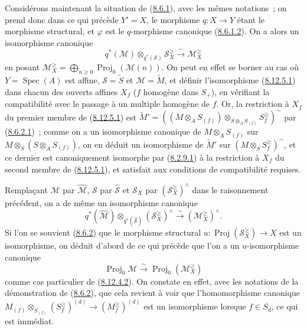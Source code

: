 \begin{env}[8.12.5]
\label{II.8.12.5-fr}
Considérons maintenant la situation de (\hyperref[II.8.6.1-fr]{8.6.1}),
avec les mêmes notations~; on prend donc dans ce qui précède $Y'=X$, le
morphisme $q:X\to Y$ étant le morphisme structural, et $\varphi$ est le
$q$-morphisme canonique (\hyperref[II.8.6.1.2-fr]{8.6.1.2}). On a alors un
isomorphisme canonique
\begin{equation}
\label{II.8.12.5.1-fr}
  q^*(\mathcal{M})\otimes_{q^*(\mathcal{S})}\mathcal{S}_X^{\geq}
  \xrightarrow{\sim}\mathcal{M}_X^{\geq}
\tag{8.12.5.1}
\end{equation}
en posant
$\mathcal{M}_X^{\geq}=\bigoplus_{n\geq0}\operatorname{Proj}_0(\mathcal{M}(n))$.
On peut en effet se borner au cas où $Y=\operatorname{Spec}(A)$ est affine,
$\mathcal{S}=\widetilde{S}$ et $\mathcal{M}=\widetilde{M}$, et définir
l'isomorphisme (\hyperref[II.8.12.5.1-fr]{8.12.5.1}) dans chacun des ouverts
affines $X_f$ ($f$ homogène dans $S_+$), en vérifiant la compatibilité avec le
passage à un multiple homogène de $f$. Or, la restriction à $X_f$ du premier
membre de (\hyperref[II.8.12.5.1-fr]{8.12.5.1}) est
$\widetilde{M}'=
\left((M\otimes_A S_{(f)})
\otimes_{S\otimes_A S_{(f)}}S_f^{\geq}\right)^{\sim}$ par
(\hyperref[II.8.6.2.1-fr]{8.6.2.1})~; comme on a un isomorphisme canonique de
$M\otimes_A S_{(f)}$ sur $M\otimes_S(S\otimes_A S_{(f)})$, on en déduit un
isomorphisme de $\widetilde{M}'$ sur
$\left(M\otimes_S S_f^{\geq}\right)^{\sim}$, et ce dernier est
canoniquement isomorphe par (\hyperref[II.8.2.9.1-fr]{8.2.9.1}) à la
restriction à $X_f$ du second membre de
(\hyperref[II.8.12.5.1-fr]{8.12.5.1}), et satisfait aux conditions de
compatibilité requises.

Remplaçant $\mathcal{M}$ par $\widehat{\mathcal{M}}$, $\mathcal{S}$ par
$\widehat{\mathcal{S}}$ et $\mathcal{S}_X$ par
$(\mathcal{S}_X^{\geq})^{\wedge}$ dans le raisonnement précédent, on a de
même un isomorphisme canonique
\begin{equation}
\label{II.8.12.5.2-fr}
  q^*(\widehat{\mathcal{M}})
  \otimes_{q^*(\widehat{\mathcal{S}})}(\mathcal{S}_X^{\geq})^{\wedge}
  \xrightarrow{\sim}(\mathcal{M}_X^{\geq})^{\wedge}.
\tag{8.12.5.2}
\end{equation}
Si l'on se souvient (\hyperref[II.8.6.2-fr]{8.6.2}) que le morphisme
structural $u:\operatorname{Proj}(\mathcal{S}_X^{\geq})\to X$ est un
isomorphisme, on déduit d'abord de ce qui précède que l'on a un
$u$-isomorphisme canonique
\begin{equation}
\label{II.8.12.5.3-fr}
  \operatorname{Proj}_0\mathcal{M}
  \xrightarrow{\sim}\operatorname{Proj}_0(\mathcal{M}_X^{\geq})
\tag{8.12.5.3}
\end{equation}
comme cas particulier de (\hyperref[II.8.12.4.2-fr]{8.12.4.2}). On constate
en effet, avec les notations de la démonstration de
(\hyperref[II.8.6.2-fr]{8.6.2}), que cela revient à voir que
l'homomorphisme canonique
$M_{(f)}\otimes_{S_{(f)}}(S_f^{\geq})^{(d)}\to(M_f^{\geq})^{(d)}$ est un
isomorphisme lorsque $f\in S_d$, ce qui est immédiat.


\end{env}
